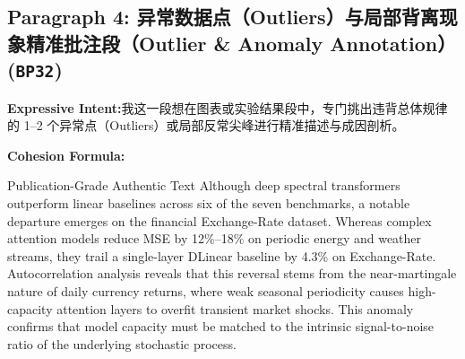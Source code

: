 \subsection*{Paragraph 4: 异常数据点（Outliers）与局部背离现象精准批注段（Outlier \& Anomaly Annotation） (\texttt{BP32})}
\noindent\textbf{Expressive Intent:}\enspace 我这一段想在图表或实验结果段中，专门挑出违背总体规律的 1--2 个异常点（Outliers）或局部反常尖峰进行精准描述与成因剖析。\par
\noindent\textbf{Cohesion Formula:}\par\vspace{4pt}
\begin{ExampleBox}{Publication-Grade Authentic Text}
Although deep spectral transformers outperform linear baselines across six of the seven benchmarks, a notable departure emerges on the financial Exchange-Rate dataset. Whereas complex attention models reduce MSE by 12\%--18\% on periodic energy and weather streams, they trail a single-layer DLinear baseline by 4.3\% on Exchange-Rate. Autocorrelation analysis reveals that this reversal stems from the near-martingale nature of daily currency returns, where weak seasonal periodicity causes high-capacity attention layers to overfit transient market shocks. This anomaly confirms that model capacity must be matched to the intrinsic signal-to-noise ratio of the underlying stochastic process.
\end{ExampleBox}

